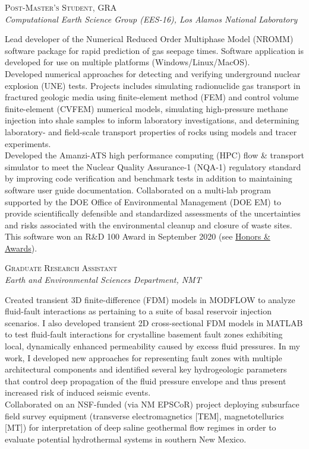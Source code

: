 \documentclass[11pt, letterpaper]{article}
\newcommand{\years}[1]{\marginnote{\scriptsize #1}}
\begin{document}
\years{2017 - 2019}\textsc{Post-Master's Student, GRA}\\
\textit{Computational Earth Science Group (EES-16), Los Alamos National Laboratory}
\begin{adjustwidth}{5pt}{0pt}
	Lead developer of the Numerical Reduced Order Multiphase Model (NROMM)
	software package for rapid prediction of gas seepage times. Software
	application is developed for use on multiple platforms
	(Windows/Linux/MacOS).\\
	Developed numerical approaches for detecting and verifying underground
	nuclear explosion (UNE) tests. Projects includes simulating
	radionuclide gas transport in fractured geologic media using finite-element
	method (FEM) and control volume finite-element (CVFEM) numerical models,
	simulating high-pressure methane injection into shale samples to inform
	laboratory investigations, and determining laboratory- and field-scale
	transport properties of rocks using models and tracer experiments.\\
	Developed the Amanzi-ATS high performance computing (HPC) flow \& transport
	simulator to meet the Nuclear Quality Assurance-1 (NQA-1) regulatory
	standard by improving code verification and benchmark tests in addition to
	maintaining software user guide documentation. Collaborated
	on a multi-lab program supported by the DOE Office of Environmental
	Management (DOE EM) to provide scientifically defensible and standardized
	assessments of the uncertainties and risks associated with the
	environmental cleanup and closure of waste sites. This software won
	an R\&D 100 Award in September 2020 (see \hyperref[sec:awards]{Honors \&
	Awards}).
\end{adjustwidth}

\years{2016 - 2017}\textsc{Graduate Research Assistant}\\
\textit{Earth and Environmental Sciences Department, NMT}
\begin{adjustwidth}{5pt}{0pt}
	Created transient 3D finite-difference (FDM) models in MODFLOW to analyze
	fluid-fault interactions as pertaining to a suite of basal reservoir
	injection scenarios. I also developed transient 2D cross-sectional FDM
	models in MATLAB to test fluid-fault interactions for crystalline basement
	fault zones exhibiting local, dynamically enhanced permeability caused by
	excess fluid pressures. In my work, I developed new approaches for
	representing fault zones with multiple architectural components and
	identified several key hydrogeologic parameters that control deep
	propagation of the fluid pressure envelope and thus present increased risk
	of induced seismic events.\\
	Collaborated on an NSF-funded (via NM EPSCoR) project deploying subsurface
	field survey equipment (transverse electromagnetics [TEM], magnetotellurics
	[MT]) for interpretation of deep saline geothermal flow regimes in order to
	evaluate potential hydrothermal systems in southern New Mexico.
\end{adjustwidth}
\end{document}
